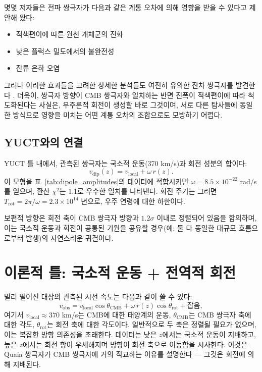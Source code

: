 \documentclass[11pt,a4paper]{article}
\begin{document}
	몇몇 저자들은 전파 쌍극자가 다음과 같은 계통 오차에 의해 영향을 받을 수 있다고 제안해 왔다:
	\begin{itemize}
		\item 적색편이에 따른 원천 개체군의 진화
		\item 낮은 플럭스 밀도에서의 불완전성
		\item 잔류 은하 오염
	\end{itemize}
	그러나 이러한 효과들을 고려한 상세한 분석들도 여전히 유의한 잔차 쌍극자를 발견한다 \cite{Oayda2024, Singal2024, Wagenveld2025}. 더욱이, 쌍극자 방향이 CMB 쌍극자와 일치하는 반면 진폭이 적색편이에 따라 척도화된다는 사실은, 우주론적 회전이 생성할 바로 그것이며, 서로 다른 탐사들에 동일한 방식으로 영향을 미치는 어떤 계통 오차의 조합으로도 모방하기 어렵다.
	
	\subsection{YUCT와의 연결}
	
	YUCT 틀 내에서, 관측된 쌍극자는 국소적 운동(370 km/s)과 회전 성분의 합이다:
	\[
	v_{\mathrm{dip}}(z) = v_{\mathrm{local}} + \omega \, r(z).
	\]
	이 모형을 표~\ref{tab:dipole_amplitudes}의 데이터에 적합시키면 \(\omega = 8.5\times10^{-22}\) rad/s를 얻으며, 환산 \(\chi^2\)는 1.1로 우수한 일치를 나타낸다. 회전 주기는 그러면 \(T_{\mathrm{rot}} = 2\pi/\omega = 2.3\times10^{14}\) 년으로, 우주 연령에 대한 하한이다.
	
	보편적 방향은 회전 축이 CMB 쌍극자 방향과 \(1.2\sigma\) 이내로 정렬되어 있음을 함의하며, 이는 국소적 운동과 회전이 공통된 기원을 공유할 경우(예: 둘 다 동일한 대규모 흐름으로부터 발생)의 자연스러운 귀결이다.
	
	\section{이론적 틀: 국소적 운동 + 전역적 회전}
	
	멀리 떨어진 대상의 관측된 시선 속도는 다음과 같이 쓸 수 있다:
	\begin{equation}
		v_{\text{obs}} = v_{\text{local}} \cos\theta_{\text{CMB}} + \omega \, r(z) \cos\theta_{\text{rot}} + \text{잡음},
	\end{equation}
	여기서 \(v_{\text{local}} \approx 370\) km/s는 CMB에 대한 태양계의 운동, \(\theta_{\text{CMB}}\)는 CMB 쌍극자 축에 대한 각도, \(\theta_{\text{rot}}\)는 회전 축에 대한 각도이다. 일반적으로 두 축은 정렬될 필요가 없으며, 이는 복잡한 방향 의존성을 초래한다. 데이터는 낮은 \(z\)에서는 국소적 운동이 지배하고, 높은 \(z\)에서는 회전 항이 우세해지며 방향이 회전 축으로 이동함을 시사한다. 이것은 Quaia 쌍극자가 CMB 쌍극자에 거의 직교하는 이유를 설명한다 — 그것은 회전에 의해 지배된다.
	
\end{document}

